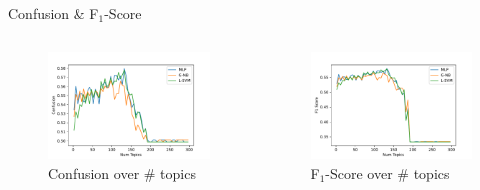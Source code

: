 \documentclass[aspectratio=169,xcolor=dvipsnames]{beamer}
\begin{document}
\begin{frame}{Confusion \& F$_1$-Score}
    \vspace*{-10mm}
    \begin{columns}
        \hspace{-5mm}
        \begin{column}{.7\textwidth}
            \begin{figure}
                \centering
                \includegraphics[width=.9\linewidth]{images/topic_confusion.pdf}
                \caption{Confusion over \# topics}
                \label{fig:conf}
            \end{figure}
        \end{column}
        \hspace*{-2cm}
       \begin{column}{.7\textwidth}
            \begin{figure}
                \centering
                \includegraphics[width=.9\linewidth]{images/topic_fscore.pdf}
                \caption{F$_1$-Score over \# topics}
                \label{fig:f1}
            \end{figure}
        \end{column}
    \end{columns}
\end{frame}
\end{document}
